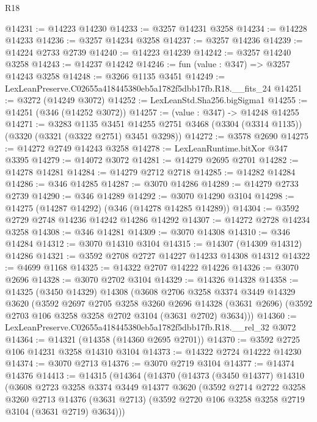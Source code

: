 \begin{lexlean}{R18}
\begin{coremodule}
@14231 := @14223 @14230
@14233 := @3257 @14231 @3258
@14234 := @14228 @14233
@14236 := @3257 @14234 @3258
@14237 := @3257 @14236
@14239 := @14224 @2733 @2739
@14240 := @14223 @14239
@14242 := @3257 @14240 @3258
@14243 := @14237 @14242
@14246 := fun (value : @347) => @3257 @14243 @3258
@14248 := @3266 @1135 @3451
@14249 := LexLeanPreserve.C02655a418445380eb5a1782f5dbb17fb.R18.__fits_24
@14251 := @3272 (@14249 @3072)
@14252 := LexLeanStd.Sha256.bigSigma1
@14255 := @14251 (@346 (@14252 @3072))
@14257 := (value : @347) -> @14248 @14255
@14271 := @3283
    @1135
    @3451
    @14255
    @2751
    @3468
    (@3304 (@3314 @1135))
    (@3320 (@3321 (@3322 @2751) @3451 @3298))
@14272 := @3578 @2690
@14275 := @14272 @2749 @14243 @3258
@14278 := LexLeanRuntime.bitXor @347 @3395
@14279 := @14072 @3072
@14281 := @14279 @2695 @2701
@14282 := @14278 @14281
@14284 := @14279 @2712 @2718
@14285 := @14282 @14284
@14286 := @346 @14285
@14287 := @3070 @14286
@14289 := @14279 @2733 @2739
@14290 := @346 @14289
@14292 := @3070 @14290 @3104
@14298 := @14275 (@14287 @14292) (@346 (@14278 @14285 @14289))
@14304 := @3592 @2729 @2748 @14236 @14242 @14286 @14292
@14307 := @14272 @2728 @14234 @3258
@14308 := @346 @14281
@14309 := @3070 @14308
@14310 := @346 @14284
@14312 := @3070 @14310 @3104
@14315 := @14307 (@14309 @14312) @14286
@14321 := @3592 @2708 @2727 @14227 @14233 @14308 @14312
@14322 := @4699 @1168
@14325 := @14322 @2707 @14222 @14226
@14326 := @3070 @2696
@14328 := @3070 @2702 @3104
@14329 := @14326 @14328
@14358 := @14325
    (@3450 @14329)
    @14308
    (@3608
      @2706
      @3258
      @3374
      @3449
      @14329
      @3620
      (@3592
        @2697
        @2705
        @3258
        @3260
        @2696
        @14328
        (@3631 @2696)
        (@3592 @2703 @106 @3258 @3258 @2702 @3104 (@3631 @2702) @3634)))
@14360 := LexLeanPreserve.C02655a418445380eb5a1782f5dbb17fb.R18.__rel_32 @3072
@14364 := @14321 (@14358 (@14360 @2695 @2701))
@14370 := @3592 @2725 @106 @14231 @3258 @14310 @3104
@14373 := @14322 @2724 @14222 @14230
@14374 := @3070 @2713
@14376 := @3070 @2719 @3104
@14377 := @14374 @14376
@14413 := @14315
    (@14364
      (@14370
        (@14373
          (@3450 @14377)
          @14310
          (@3608
            @2723
            @3258
            @3374
            @3449
            @14377
            @3620
            (@3592
              @2714
              @2722
              @3258
              @3260
              @2713
              @14376
              (@3631 @2713)
              (@3592 @2720 @106 @3258 @3258 @2719 @3104 (@3631 @2719) @3634)))

\end{coremodule}
\end{lexlean}
